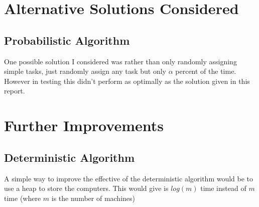 \documentclass{article}
\begin{document}
	\section{Alternative Solutions Considered}
		\subsection{Probabilistic Algorithm}
			One possible solution I considered was rather than only randomly assigning simple tasks, just randomly assign any task but only $\alpha$ percent of the time. However in testing this didn't perform as optimally as the solution given in this report.
			
	\section{Further Improvements}
		\subsection{Deterministic Algorithm}
			A simple way to improve the effective of the deterministic algorithm would be to use a heap to store the computers. This would give is $log(m)$ time instead of $m$ time (where $m$ is the number of machines)
		
  	
\end{document}
